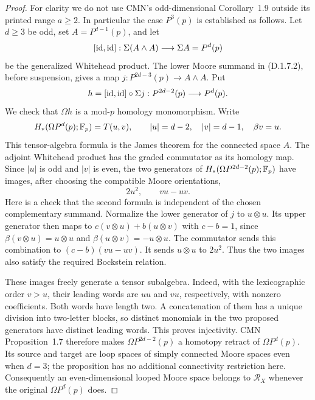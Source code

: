 \begin{proof}
For clarity we do not use CMN's odd-dimensional Corollary~1.9
outside its printed range $a\geq2$. In particular the case
$P^3(p)$ is established as follows. Let $d\geq3$ be odd, set
$A=P^{d-1}(p)$, and let
\[
 [\mathrm{id},\mathrm{id}]:\Sigma(A\wedge A)\longrightarrow\Sigma A=P^d(p)
\]
be the generalized Whitehead product. The lower Moore summand in
(D.1.7.2), before suspension, gives a map
$j:P^{2d-3}(p)\to A\wedge A$. Put
\[
 h=[\mathrm{id},\mathrm{id}]\circ\Sigma j:P^{2d-2}(p)\longrightarrow P^d(p).
\]
We check that $\Omega h$ is a mod-$p$ homology monomorphism.
Write
\[
 H_*(\Omega P^d(p);\mathbb F_p)=T(u,v),\qquad
 |u|=d-2,\quad |v|=d-1,\quad\beta v=u.
\]
This tensor-algebra formula is the James theorem for the connected
space $A$. The adjoint Whitehead product has the graded commutator
as its homology map. Since $|u|$ is odd and $|v|$ is even, the
two generators of $H_*(\Omega P^{2d-2}(p);\mathbb F_p)$ have images,
after choosing the compatible Moore orientations,
\[
                  2u^2,\qquad vu-uv.                \tag{D.1.7.4}
\]
Here is a check that the second formula is independent of the
chosen complementary summand. Normalize the lower generator of
$j$ to $u\otimes u$. Its upper generator then maps to
$c(v\otimes u)+b(u\otimes v)$ with $c-b=1$, since
$\beta(v\otimes u)=u\otimes u$ and
$\beta(u\otimes v)=-u\otimes u$. The commutator sends this
combination to $(c-b)(vu-uv)$. It sends $u\otimes u$ to $2u^2$.
Thus the two images also satisfy the required Bockstein relation.

These images freely generate a tensor subalgebra. Indeed, with
the lexicographic order $v>u$, their leading words are $uu$ and
$vu$, respectively, with nonzero coefficients. Both words have
length two. A concatenation of them has a unique division into
two-letter blocks, so distinct monomials in the two proposed
generators have distinct leading words. This proves injectivity.
CMN Proposition~1.7 therefore makes $\Omega P^{2d-2}(p)$ a
homotopy retract of $\Omega P^d(p)$. Its source and target are
loop spaces of simply connected Moore spaces even when $d=3$;
the proposition has no additional connectivity restriction here.
Consequently an even-dimensional looped Moore space belongs to
$\mathcal R_X$ whenever the original $\Omega P^d(p)$ does.


\end{proof}
